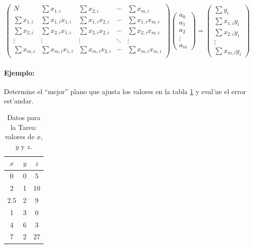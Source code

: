 \documentclass[a4paper]{report}
\begin{document}
\begin{equation}
\left(\begin{array}{ccccc}
N & \sum x_{1,i} & \sum x_{2,i} & \cdots &  \sum x_{m,i} \\
\sum x_{1,i} & \sum x_{1,i}x_{1,i} & \sum x_{1,i}x_{2,i} &\cdots & \sum x_{1,i}x_{m,i}  \\
\sum x_{2,i} & \sum x_{2,i}x_{1,i} & \sum x_{2,i}x_{2,i} &\cdots & \sum x_{2,i}x_{m,i}  \\
\vdots & \vdots  & \vdots & \ddots & \vdots \\
\sum x_{m,i} & \sum x_{m,i}x_{1,i} & \sum x_{m,i}x_{2,i} &\cdots & \sum x_{m,i}x_{m,i}  \\
\end{array}\right)
\left(\begin{array}{c} a_0\\a_1\\a_2\\ \vdots \\ a_m\end{array}\right)
=
\left(\begin{array}{c} \sum y_i\\\sum x_{1,i}y_i\\\sum x_{2,i}y_i \\\vdots\\ \sum x_{m,i}y_i\end{array}\right)
\end{equation}

\paragraph{Ejemplo:} Determine el ``mejor'' plano que ajusta los valores en la tabla \ref{tab-xyz} y eval'ue el error est'andar.
\begin{table}[h!]
\begin{center}
\begin{tabular}{c|c|c}
$x$ & $y$ & $z$ \\ \hline
0 & 0 & 5 \\ 
2 & 1 & 10 \\ 
2.5 & 2 & 9 \\ 
1 & 3 & 0 \\ 
4 & 6 & 3 \\ 
7 & 2 & 27 \\ 
\end{tabular}
\caption{Datos para la Tarea: valores de $x$, $y$ y $z$.}
\label{tab-xyz}
\end{center}
\end{table}
\end{document}
